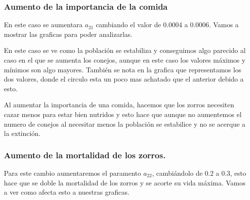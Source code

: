 \documentclass[]{article}
\begin{document}
\subsubsection{Aumento de la importancia de la comida}
En este caso se aumentara $a_{21}$ cambiando el valor de 0.0004 a 0.0006. Vamos a mostrar las graficas para poder analizarlas. 
\begin{figure}[H]
	\centering
	
\end{figure}

En este caso se ve como la población se estabiliza y conseguimos algo parecido al caso en el que se aumenta los conejos, aunque en este caso los valores máximos y mínimos son algo mayores. También se nota en la grafica que representamos los dos valores, donde el circulo esta un poco mas achatado que el anterior debido a esto.
\newline

Al aumentar la importancia de una comida, hacemos que los zorros necesiten cazar menos para estar bien nutridos y esto hace que aunque no aumentemos el numero de conejos al necesitar menos la población se estabilice y no se acerque a la extinción.

\subsubsection{Aumento de la mortalidad de los zorros.}
Para este cambio aumentaremos el paramento $a_{22}$, cambiándolo de 0.2 a 0.3, esto hace que se doble la mortalidad de los zorros y se acorte su vida máxima. Vamos a ver como afecta esto a nuestras graficas.
\end{document}
